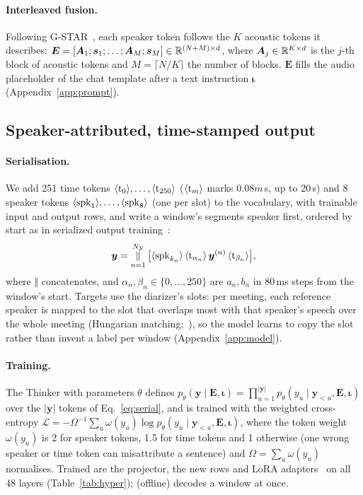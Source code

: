 \paragraph{Interleaved fusion.} Following G-STAR~\citep{peng2026gstar}, each speaker token follows the $K$ acoustic
tokens it describes: $\bm{E}=[\bm{A}_1;\bm{s}_1;\dots;\bm{A}_M;\bm{s}_M]\in\mathbb{R}^{(N+M)\times d}$, where
$\bm{A}_j\in\mathbb{R}^{K\times d}$ is the $j$-th block of acoustic tokens and $M=\lceil N/K\rceil$ the number of blocks.
$\bm{E}$ fills the audio placeholder of the chat template after a text instruction $\bm{\iota}$ (Appendix~\ref{app:prompt}).

\subsection{Speaker-attributed, time-stamped output}
\label{sec:method-out}
\label{sec:method-train}

\paragraph{Serialisation.} We add 251 time tokens $\langle\mathrm{t}_{0}\rangle,\dots,\langle\mathrm{t}_{250}\rangle$ ($\langle\mathrm{t}_{m}\rangle$ marks $0.08m$\,s, up to
20\,s) and 8 speaker tokens $\langle\mathrm{spk}_{1}\rangle,\dots,\langle\mathrm{spk}_{8}\rangle$ (one per slot) to the vocabulary, with trainable input and output
rows, and write a window's segments speaker first, ordered by start as in serialized output training~\citep{kanda2020sot}:
\begin{equation}
\bm{y}=\mathop{\Vert}_{n=1}^{N_\mathcal{Y}}\big[\langle\mathrm{spk}_{k_n}\rangle\,\langle\mathrm{t}_{\alpha_n}\rangle\,\bm{y}^{(n)}\,\langle\mathrm{t}_{\beta_n}\rangle\big],
\label{eq:serial}
\end{equation}
where $\Vert$ concatenates, and $\alpha_n,\beta_n\in\{0,\dots,250\}$ are $a_n,b_n$ in 80\,ms steps from the window's
start. Targets use the diarizer's slots: per meeting, each reference speaker is mapped to the slot that overlaps most
with that speaker's speech over the whole meeting (Hungarian matching;~\citealp{kuhn1955hungarian}), so the model
learns to copy the slot rather than invent a label per window (Appendix~\ref{app:model}).

\paragraph{Training.} The Thinker with parameters $\theta$ defines
$p_\theta(\bm{y}\mid\bm{E},\bm{\iota})=\prod_{u=1}^{|\bm{y}|}p_\theta(y_u\mid\bm{y}_{<u},\bm{E},\bm{\iota})$ over the
$|\bm{y}|$ tokens of Eq.~\eqref{eq:serial}, and is trained with the weighted cross-entropy
$\mathcal{L}=-\Omega^{-1}\sum_u\omega(y_u)\log p_\theta(y_u\mid\bm{y}_{<u},\bm{E},\bm{\iota})$, where the token weight
$\omega(y_u)$ is 2 for speaker tokens, 1.5 for time tokens and 1 otherwise (one wrong speaker or time token can
misattribute a sentence) and $\Omega=\sum_u\omega(y_u)$ normalises. Trained are the projector, the new rows and LoRA
adapters~\citep{hu2022lora} on all 48 layers (Table~\ref{tab:hyper}); \sys{} (offline) decodes a window at once.

